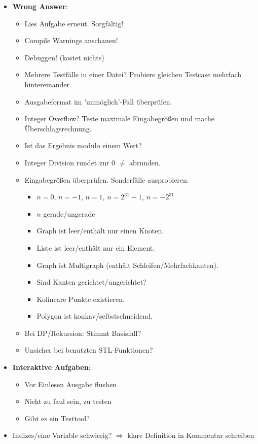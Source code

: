 \begin{itemize}
	\item \textbf{Wrong Answer}:
	\begin{itemize}
		\item Lies Aufgabe erneut. Sorgfältig!
		\item Compile Warnings anschauen!
		\item Debuggen! (kostet nichts)
		\item Mehrere Testfälle in einer Datei? Probiere gleichen Testcase mehrfach hintereinander.
		\item Ausgabeformat im 'unmöglich'-Fall überprüfen.
		\item Integer Overflow? Teste maximale Eingabegrößen und mache Überschlagsrechnung.
		\item Ist das Ergebnis modulo einem Wert?
		\item Integer Division rundet zur $0$ $\neq$ abrunden.
		\item Eingabegrößen überprüfen. Sonderfälle ausprobieren.
		\begin{itemize}
			\item $n = 0$, $n = -1$, $n = 1$, $n = 2^{31}-1$, $n = -2^{31}$
			\item $n$ gerade/ungerade
			\item Graph ist leer/enthält nur einen Knoten.
			\item Liste ist leer/enthält nur ein Element.
			\item Graph ist Multigraph (enthält Schleifen/Mehrfachkanten).
			\item Sind Kanten gerichtet/ungerichtet?
			\item Kolineare Punkte existieren.
			\item Polygon ist konkav/selbstschneidend.
		\end{itemize}
		\item Bei DP/Rekursion: Stimmt Basisfall?
		\item Unsicher bei benutzten STL-Funktionen?
	\end{itemize}

	\item \textbf{Interaktive Aufgaben}:
	\begin{itemize}
		\item Vor Einlesen Ausgabe flushen
		\item Nicht zu faul sein, zu testen
		\item Gibt es ein Testtool?
	\end{itemize}

	\item Indizes/eine Variable schwierig? $\Rightarrow$ klare Definition in Kommentar schreiben
\end{itemize}

